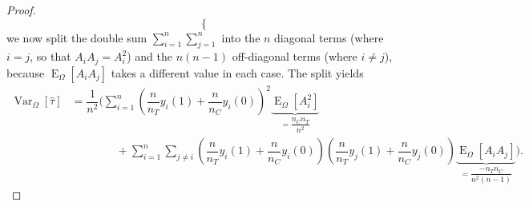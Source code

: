 \documentclass[12pt,leqno]{article}
\theoremstyle{newstyle}
\DeclareMathOperator{\E}{\mathrm{E}}
\DeclareMathOperator{\Var}{\mathrm{Var}}
\newcommand{\bZ}{\bm{Z}}   \newcommand{\bz}{\bm{z}}   %
\newcommand{\EZ}{\E_{\Omega}}    \newcommand{\VarZ}{\Var_{\Omega}}  %
\newcommand{\po}[2]{y_{#1}(#2)}     %
\newcommand{\tauhat}{\hat{\tau}}
\begin{document}
\begin{proof}
\begin{equation*}
\begin{cases}
\end{cases}
\end{equation*}
\normalsize
we now split the double sum $\sum_{i = 1}^n \sum_{j = 1}^n$ into the $n$ diagonal terms (where $i = j$, so that $A_i A_j = A_i^2$) and the $n(n - 1)$ off-diagonal terms (where $i \neq j$), because $\EZ[A_i A_j]$ takes a different value in each case. The split yields
\small
\begin{align*}
\VarZ\left[\tauhat\right] & = \dfrac{1}{n^2} \Bigg(\sum \limits_{i = 1}^n \left(\dfrac{n}{n_T} \po{i}{1} + \dfrac{n}{n_C} \po{i}{0}\right)^2\underbrace{\EZ\left[A_i^2\right]}_{= \dfrac{n_C n_T}{n^2}} \\
& \qquad\qquad + \sum \limits_{i = 1}^n \sum \limits_{j \neq i} \left(\dfrac{n}{n_T} \po{i}{1} + \dfrac{n}{n_C} \po{i}{0}\right)\left(\dfrac{n}{n_T} \po{j}{1} + \dfrac{n}{n_C} \po{j}{0}\right)\underbrace{\EZ\left[A_i A_j\right]}_{= \dfrac{-n_T n_C}{n^2\left(n - 1\right)}}\Bigg).
\end{align*}
\normalsize


\end{proof}
\end{document}

